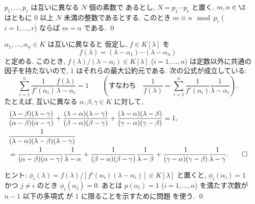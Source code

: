\documentclass[12pt,twoside]{jarticle}
\begin{document}
\begin{question}
  $p_1,\dots,p_r$ は互いに異なる $N$ 個の素数で
  あるとし, $N=p_1\cdots p_r$ と置く.  
  $m,n\in\Z$ はともに $0$ 以上 $N$ 未満の整数であるとする. 
  このとき $m\equiv n\mod{p_i}$ ($i=1,\dots,r$) ならば $m=n$ である. 
  \qed
\end{question}


\begin{question}
\label{q:Lagrange-interpolation-1}
  $\alpha_1,\dots,\alpha_n\in K$ は互いに異なると
  仮定し, $f\in K[\lambda]$ を
  \begin{equation*}
    f(\lambda)=(\lambda-\alpha_1)\cdots(\lambda-\alpha_n)
  \end{equation*}
  と定める.
  このとき, $f(\lambda)/(\lambda-\alpha_i)\in K[\lambda]$ ($i=1,\dots,n$) 
  は定数以外に共通の因子を持たないので, $1$ はそれらの最大公約元である. 
  次の公式が成立している:
  \begin{equation*}
    \sum_{i=1}^n 
    \frac{1}{f'(\alpha_i)}\frac{f(\lambda)}{\lambda-\alpha_i}
    = 1
    \qquad
    \left(
      \text{すなわち}\quad
      \frac{1}{f(\lambda)}
      = \sum_{i=1}^n 
      \frac{1}{f'(\alpha_i)}\frac{1}{\lambda-\alpha_i}
    \right).
  \end{equation*}
  たとえば, 互いに異なる $\alpha,\beta,\gamma\in K$ に対して,
  \begin{align*}
    &
    \frac{(\lambda-\beta)(\lambda-\gamma)}{(\alpha-\beta)(\alpha-\gamma)} +
    \frac{(\lambda-\alpha)(\lambda-\gamma)}{(\beta-\alpha)(\beta-\gamma)} +
    \frac{(\lambda-\alpha)(\lambda-\beta)}{(\gamma-\alpha)(\gamma-\beta)} 
    = 1,
    \\ &
    \frac{1}{(\lambda-\alpha)(\lambda-\beta)(\lambda-\gamma)}
    \\ &
    =
    \frac{1}{(\alpha-\beta)(\alpha-\gamma)}
    \frac{1}{\lambda-\alpha} +
    \frac{1}{(\beta-\alpha)(\beta-\gamma)}
    \frac{1}{\lambda-\beta} +
    \frac{1}{(\gamma-\alpha)(\gamma-\beta)}
    \frac{1}{\lambda-\gamma}.
    \qed
  \end{align*}
\end{question}

\noindent
ヒント: 
$\phi_i(\lambda)=f(\lambda)/[f'(\alpha_i)(\lambda-\alpha_i)]\in K[\lambda]$ 
と置くと, $\phi_i(\alpha_i)=1$ かつ $j\ne i$ のとき $\phi_i(\alpha_j)=0$.
あとは $p(\alpha_i)=1$ ($i=1,\dots,n$) を満たす次数が $n-1$ 以下の多項式
が $1$ に限ることを示すために問題  を使う.
\qed
\end{document}
